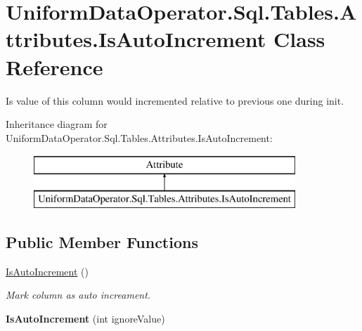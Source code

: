 \hypertarget{class_uniform_data_operator_1_1_sql_1_1_tables_1_1_attributes_1_1_is_auto_increment}{}\section{Uniform\+Data\+Operator.\+Sql.\+Tables.\+Attributes.\+Is\+Auto\+Increment Class Reference}
\label{class_uniform_data_operator_1_1_sql_1_1_tables_1_1_attributes_1_1_is_auto_increment}


Is value of this column would incremented relative to previous one during init.  


Inheritance diagram for Uniform\+Data\+Operator.\+Sql.\+Tables.\+Attributes.\+Is\+Auto\+Increment\+:\begin{figure}[H]
\begin{center}
\leavevmode
\includegraphics[height=2.000000cm]{df/d8d/class_uniform_data_operator_1_1_sql_1_1_tables_1_1_attributes_1_1_is_auto_increment}
\end{center}
\end{figure}
\subsection*{Public Member Functions}
\begin{DoxyCompactItemize}
\item 
\mbox{\hyperlink{class_uniform_data_operator_1_1_sql_1_1_tables_1_1_attributes_1_1_is_auto_increment_aa14d70b6dd5e55a1e983f7740a286570}{Is\+Auto\+Increment}} ()
\begin{DoxyCompactList}\small\item\em Mark column as auto increament. \end{DoxyCompactList}\item 
\mbox{\label{class_uniform_data_operator_1_1_sql_1_1_tables_1_1_attributes_1_1_is_auto_increment_a651d5fdb4b4aacc256294e386de2cd49}} 
{\bfseries Is\+Auto\+Increment} (int ignore\+Value)
\end{DoxyCompactItemize}

